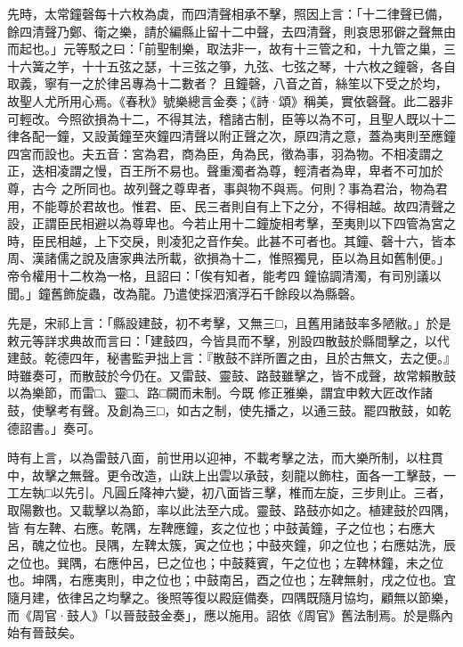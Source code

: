 \begin{pinyinscope}
 先時，太常鐘磬每十六枚為虡，而四清聲相承不擊，照因上言：「十二律聲已備，餘四清聲乃鄭、衛之樂，請於編縣止留十二中聲，去四清聲，則哀思邪僻之聲無由而起也。」元等駁之曰：「前聖制樂，取法非一，故有十三管之和，十九管之巢，三十六簧之竽，十十五弦之瑟，十三弦之箏，九弦、七弦之琴，十六枚之鐘磬，各自取義，寧有一之於律呂專為十二數者？
 且鐘磬，八音之首，絲笙以下受之於均，故聖人尤所用心焉。《春秋》號樂總言金奏；《詩·頌》稱美，實依磬聲。此二器非可輕改。今照欲損為十二，不得其法，稽諸古制，臣等以為不可，且聖人既以十二律各配一鐘，又設黃鐘至夾鐘四清聲以附正聲之次，原四清之意，蓋為夷則至應鐘四宮而設也。夫五音：宮為君，商為臣，角為民，徵為事，羽為物。不相凌謂之正，迭相凌謂之慢，百王所不易也。聲重濁者為尊，輕清者為卑，卑者不可加於尊，古今
 之所同也。故列聲之尊卑者，事與物不與焉。何則？事為君治，物為君用，不能尊於君故也。惟君、臣、民三者則自有上下之分，不得相越。故四清聲之設，正謂臣民相避以為尊卑也。今若止用十二鐘旋相考擊，至夷則以下四管為宮之時，臣民相越，上下交戾，則凌犯之音作矣。此甚不可者也。其鐘、磬十六，皆本周、漢諸儒之說及唐家典法所載，欲損為十二，惟照獨見，臣以為且如舊制便。」帝令權用十二枚為一格，且詔曰：「俟有知者，能考四
 鐘協調清濁，有司別議以聞。」鐘舊飾旋蟲，改為龍。乃遣使採泗濱浮石千餘段以為縣磬。



 先是，宋祁上言：「縣設建鼓，初不考擊，又無三□，且舊用諸鼓率多陋敝。」於是敕元等詳求典故而言曰：「建鼓四，今皆具而不擊，別設四散鼓於縣間擊之，以代建鼓。乾德四年，秘書監尹拙上言：『散鼓不詳所置之由，且於古無文，去之便。』時雖奏可，而散鼓於今仍在。又雷鼓、靈鼓、路鼓雖擊之，皆不成聲，故常賴散鼓以為樂節，而雷□、靈□、路□闕而未制。今既
 修正雅樂，謂宜申敕大匠改作諸鼓，使擊考有聲。及創為三□，如古之制，使先播之，以通三鼓。罷四散鼓，如乾德詔書。」奏可。



 時有上言，以為雷鼓八面，前世用以迎神，不載考擊之法，而大樂所制，以柱貫中，故擊之無聲。更令改造，山趺上出雲以承鼓，刻龍以飾柱，面各一工擊鼓，一工左執□以先引。凡圓丘降神六變，初八面皆三擊，椎而左旋，三步則止。三者，取陽數也。又載擊以為節，率以此法至六成。靈鼓、路鼓亦如之。植建鼓於四隅，皆
 有左鞞、右應。乾隅，左鞞應鐘，亥之位也；中鼓黃鐘，子之位也；右應大呂，醜之位也。艮隅，左鞞太簇，寅之位也；中鼓夾鐘，卯之位也；右應姑洗，辰之位也。巽隅，右應仲呂，巳之位也；中鼓蕤賓，午之位也；左鞞林鐘，未之位也。坤隅，右應夷則，申之位也；中鼓南呂，酉之位也；左鞞無射，戌之位也。宜隨月建，依律呂之均擊之。後照等復以殿庭備奏，四隅既隨月協均，顧無以節樂，而《周官·鼓人》「以晉鼓鼓金奏」，應以施用。詔依《周官》舊法制焉。於是縣內
 始有晉鼓矣。




\end{pinyinscope}
